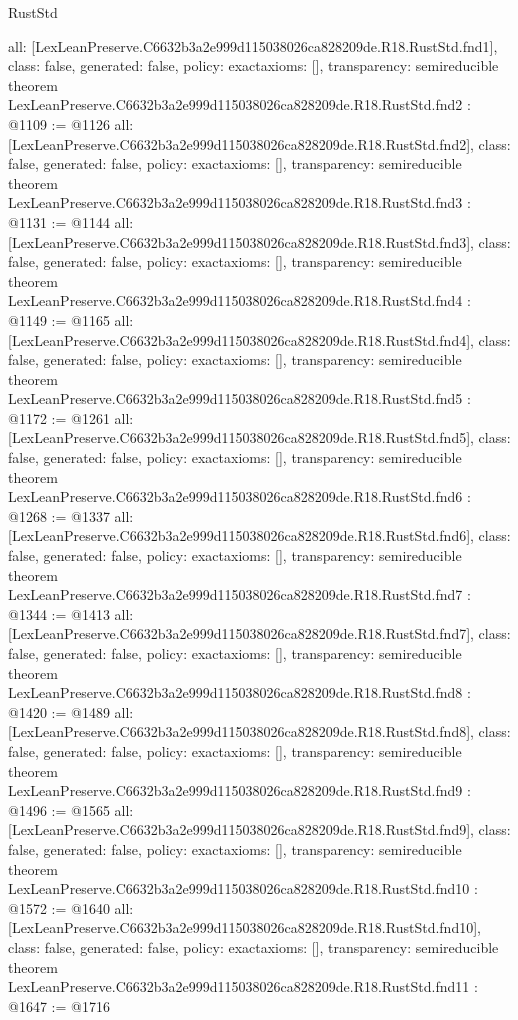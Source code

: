 \begin{lexlean}{RustStd}
\begin{coremodule}
{  all: [LexLeanPreserve.C6632b3a2e999d115038026ca828209de.R18.RustStd.fnd1],
  class: false,
  generated: false,
  policy: exact{axioms: []},
  transparency: semireducible
}
theorem LexLeanPreserve.C6632b3a2e999d115038026ca828209de.R18.RustStd.fnd2 : @1109 := @1126 {
  all: [LexLeanPreserve.C6632b3a2e999d115038026ca828209de.R18.RustStd.fnd2],
  class: false,
  generated: false,
  policy: exact{axioms: []},
  transparency: semireducible
}
theorem LexLeanPreserve.C6632b3a2e999d115038026ca828209de.R18.RustStd.fnd3 : @1131 := @1144 {
  all: [LexLeanPreserve.C6632b3a2e999d115038026ca828209de.R18.RustStd.fnd3],
  class: false,
  generated: false,
  policy: exact{axioms: []},
  transparency: semireducible
}
theorem LexLeanPreserve.C6632b3a2e999d115038026ca828209de.R18.RustStd.fnd4 : @1149 := @1165 {
  all: [LexLeanPreserve.C6632b3a2e999d115038026ca828209de.R18.RustStd.fnd4],
  class: false,
  generated: false,
  policy: exact{axioms: []},
  transparency: semireducible
}
theorem LexLeanPreserve.C6632b3a2e999d115038026ca828209de.R18.RustStd.fnd5 : @1172 := @1261 {
  all: [LexLeanPreserve.C6632b3a2e999d115038026ca828209de.R18.RustStd.fnd5],
  class: false,
  generated: false,
  policy: exact{axioms: []},
  transparency: semireducible
}
theorem LexLeanPreserve.C6632b3a2e999d115038026ca828209de.R18.RustStd.fnd6 : @1268 := @1337 {
  all: [LexLeanPreserve.C6632b3a2e999d115038026ca828209de.R18.RustStd.fnd6],
  class: false,
  generated: false,
  policy: exact{axioms: []},
  transparency: semireducible
}
theorem LexLeanPreserve.C6632b3a2e999d115038026ca828209de.R18.RustStd.fnd7 : @1344 := @1413 {
  all: [LexLeanPreserve.C6632b3a2e999d115038026ca828209de.R18.RustStd.fnd7],
  class: false,
  generated: false,
  policy: exact{axioms: []},
  transparency: semireducible
}
theorem LexLeanPreserve.C6632b3a2e999d115038026ca828209de.R18.RustStd.fnd8 : @1420 := @1489 {
  all: [LexLeanPreserve.C6632b3a2e999d115038026ca828209de.R18.RustStd.fnd8],
  class: false,
  generated: false,
  policy: exact{axioms: []},
  transparency: semireducible
}
theorem LexLeanPreserve.C6632b3a2e999d115038026ca828209de.R18.RustStd.fnd9 : @1496 := @1565 {
  all: [LexLeanPreserve.C6632b3a2e999d115038026ca828209de.R18.RustStd.fnd9],
  class: false,
  generated: false,
  policy: exact{axioms: []},
  transparency: semireducible
}
theorem LexLeanPreserve.C6632b3a2e999d115038026ca828209de.R18.RustStd.fnd10 : @1572 := @1640 {
  all: [LexLeanPreserve.C6632b3a2e999d115038026ca828209de.R18.RustStd.fnd10],
  class: false,
  generated: false,
  policy: exact{axioms: []},
  transparency: semireducible
}
theorem LexLeanPreserve.C6632b3a2e999d115038026ca828209de.R18.RustStd.fnd11 : @1647 := @1716 {
}
\end{coremodule}
\end{lexlean}
